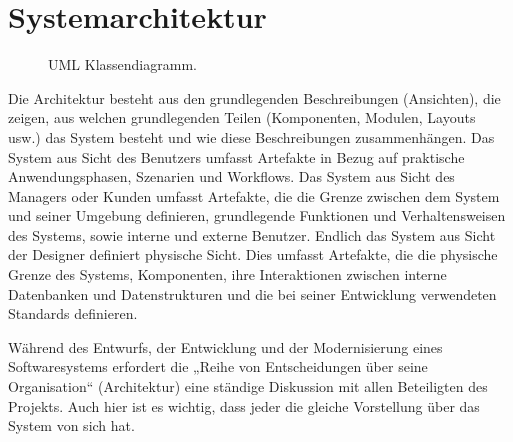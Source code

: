 \section{Systemarchitektur}
\label{sec:design:arch}
\begin{figure}
	\centering
	\caption{UML Klassendiagramm.}
	\label{fig:class}
\end{figure}
Die Architektur besteht aus den grundlegenden Beschreibungen (Ansichten),  die zeigen, aus welchen grundlegenden Teilen (Komponenten, Modulen, Layouts usw.) das System besteht und wie diese Beschreibungen zusammenhängen. Das System aus Sicht des Benutzers umfasst Artefakte in Bezug auf praktische Anwendungsphasen, Szenarien und Workflows. Das System aus Sicht des Managers oder Kunden umfasst Artefakte, die die Grenze zwischen dem System und seiner Umgebung definieren, grundlegende Funktionen und Verhaltensweisen des Systems, sowie interne und externe Benutzer. Endlich das System aus Sicht der Designer definiert physische Sicht. Dies umfasst Artefakte, die die physische Grenze des Systems, Komponenten, ihre Interaktionen zwischen interne Datenbanken und Datenstrukturen und die bei seiner Entwicklung verwendeten Standards definieren.

Während des Entwurfs, der Entwicklung und der Modernisierung eines Softwaresystems erfordert die „Reihe von Entscheidungen über seine Organisation“ (Architektur) eine ständige Diskussion mit allen Beteiligten des Projekts. Auch hier ist es wichtig, dass jeder die gleiche Vorstellung über das System von sich hat. 

